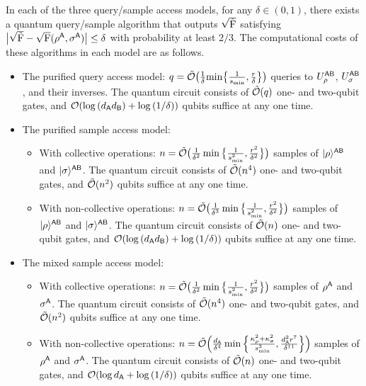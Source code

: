 \begin{theorem}
\label{thm:informal fidelity result}
In each of the three query/sample access models, for any $\delta \in (0, 1)$, there exists a quantum query/sample algorithm that outputs $\sqrt{\tilde{{\mathrm{F}}}}$ satisfying $\big|\sqrt{\tilde{{\mathrm{F}}}} - \sqrt{{\mathrm{F}}}(\rho^{\mathsf{A}}, \sigma^{\mathsf{A}})\big| \leq \delta$ with probability at least $2/3$. 
The computational costs of these algorithms in each model are as follows.
\begin{itemize}
\item The purified query access model: $q = \tilde{{\mathcal{O}}}\big(\frac{1}{\delta}{\rm min}\big\{\frac{1}{s_{\rm min}}, \frac{r}{\delta}\big\}\big)$ queries to $U_\rho^{{\mathsf{A}}{\mathsf{B}}}$, $U_\sigma^{{\mathsf{A}}{\mathsf{B}}}$, and their inverses. The quantum circuit consists of $\tilde{{\mathcal{O}}}(q)$ one- and two-qubit gates, and ${\mathcal{O}}(\log{(d_{\mathsf{A}}d_{\mathsf{B}})} + \log{(1/\delta}))$ qubits suffice at any one time.
\item The purified sample access model: 
\begin{itemize}
    \item With collective operations: $n = \tilde{{\mathcal{O}}}\big(\frac{1}{\delta^2} \min\big\{\frac{1}{s_{\rm min}^2}, \frac{r^2}{\delta^2}\big\}\big)$ samples of $|\rho\rangle^{{\mathsf{A}}{\mathsf{B}}}$ and $|\sigma\rangle^{{\mathsf{A}}{\mathsf{B}}}$. The quantum circuit consists of $\tilde{{\mathcal{O}}}(n^4)$ one- and two-qubit gates, and $\tilde{{\mathcal{O}}}(n^2)$ qubits suffice at any one time.
    \item With non-collective operations: $n = \tilde{{\mathcal{O}}}\big(\frac{1}{\delta^3} \min\big\{\frac{1}{s_{\rm min}^2}, \frac{r^2}{\delta^2}\big\}\big)$ samples of $|\rho\rangle^{{\mathsf{A}}{\mathsf{B}}}$ and $|\sigma\rangle^{{\mathsf{A}}{\mathsf{B}}}$. The quantum circuit consists of $\tilde{{\mathcal{O}}}(n)$ one- and two-qubit gates, and ${\mathcal{O}}(\log{(d_{\mathsf{A}}d_{\mathsf{B}})} + \log{(1/\delta)})$ qubits suffice at any one time.
\end{itemize}
\item The mixed sample access model: 
\begin{itemize}
    \item With collective operations: $n = \tilde{{\mathcal{O}}}\big(\frac{1}{\delta^2} \min\big\{\frac{1}{s_{\rm min}^2}, \frac{r^2}{\delta^2}\big\}\big)$ samples of $\rho^{\mathsf{A}}$ and $\sigma^{\mathsf{A}}$. 
    The quantum circuit consists of $\tilde{{\mathcal{O}}}(n^4)$ one- and two-qubit gates, and $\tilde{{\mathcal{O}}}(n^2)$ qubits suffice at any one time.
    \item With non-collective operations: $n = \tilde{{\mathcal{O}}}\Big(\frac{d_{\mathsf{A}}}{\delta^4}\min\Big\{\frac{\kappa_\rho^2 + \kappa_\sigma^2}{s_{\rm min}^3}, \frac{d_{\mathsf{A}}^2 r^7}{\delta^{11}}\Big\}\Big)$ samples of $\rho^{\mathsf{A}}$ and $\sigma^{\mathsf{A}}$. The quantum circuit consists of $\tilde{{\mathcal{O}}}(n)$ one- and two-qubit gates, and ${\mathcal{O}}(\log{d_{\mathsf{A}}} + \log{(1/\delta)})$ qubits suffice at any one time.
\end{itemize}
\end{itemize}

\end{theorem}



